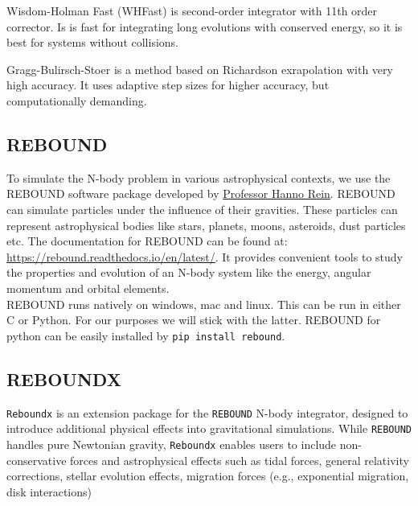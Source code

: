 \documentclass[12pt,a4paper]{article}
\begin{document}
Wisdom-Holman Fast (WHFast) is second-order integrator with 11th order corrector. Is is fast for integrating long evolutions with conserved energy, so it is best for systems without collisions.

Gragg-Bulirsch-Stoer is a method based on Richardson exrapolation with very high accuracy. It uses adaptive step sizes for higher accuracy, but computationally demanding.


\subsection{REBOUND}
To simulate the N-body problem in various astrophysical contexts, we use the REBOUND software package developed by \href{https://hanno-rein.de/}{ Professor Hanno Rein}. 
REBOUND can simulate particles under the influence of their gravities. These particles can represent astrophysical bodies like stars, planets, moons, asteroids, dust particles etc\cite{rebound}. 
The documentation for REBOUND can be found at: \href{https://rebound.readthedocs.io/en/latest/}{https://rebound.readthedocs.io/en/latest/}. It provides convenient tools to study the properties and evolution of an N-body system
like the energy, angular momentum and orbital elements. 
\\ REBOUND runs natively on windows, mac and linux. This can be run in either C or Python. For our purposes
we will stick with the latter. REBOUND for python can be easily installed by \texttt{pip install rebound}.

\subsection{REBOUNDX}
\texttt{Reboundx} is an extension package for the \texttt{REBOUND} N-body integrator, designed to introduce additional physical effects into gravitational simulations. While \texttt{REBOUND} handles pure Newtonian gravity, 
\texttt{Reboundx} enables users to include non-conservative forces and astrophysical effects such as tidal forces, general relativity corrections, stellar evolution effects, migration forces (e.g., exponential migration, disk interactions)\\
\end{document}
